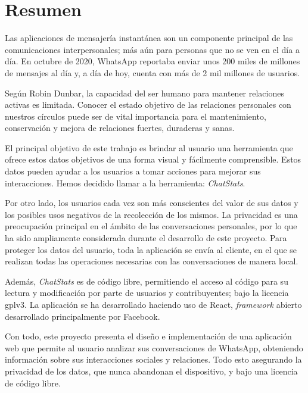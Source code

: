 \cleardoublepage
{}
\chapter*{Resumen}

Las aplicaciones de mensajería instantánea son un componente principal de las comunicaciones interpersonales; más aún para personas que no se ven en el día a día. En octubre de 2020, WhatsApp reportaba enviar unos 200 miles de millones de mensajes al día \cite{whatsAppsPerDay} y, a día de hoy, cuenta con más de 2 mil millones de usuarios.\cite{whatsAppsUsers}

Según Robin Dunbar, la capacidad del ser humano para mantener relaciones activas es limitada.\cite{dunbarNumber} Conocer el estado objetivo de las relaciones personales con nuestros círculos puede ser de vital importancia para el mantenimiento, conservación y mejora de relaciones fuertes, duraderas y sanas.

El principal objetivo de este trabajo es brindar al usuario una herramienta que ofrece estos datos objetivos de una forma visual y fácilmente comprensible. Estos datos pueden ayudar a los usuarios a tomar acciones para mejorar sus interacciones. Hemos decidido llamar a la herramienta: \textit{ChatStats}.

Por otro lado, los usuarios cada vez son más conscientes del valor de sus datos y los posibles usos negativos de la recolección de los mismos. La privacidad es una preocupación principal en el ámbito de las conversaciones personales, por lo que ha sido ampliamente considerada durante el desarrollo de este proyecto. Para proteger los datos del usuario, toda la aplicación se envía al cliente, en el que se realizan todas las operaciones necesarias con las conversaciones de manera local. 

Además, \textit{ChatStats} es de código libre, permitiendo el acceso al código para su lectura y modificación por parte de usuarios y contribuyentes; bajo la licencia \acrfull{gplv3}.\cite{GPLv3} La aplicación se ha desarrollado haciendo uso de React, \textit{framework} abierto desarrollado principalmente por Facebook.

Con todo, este proyecto presenta el diseño e implementación de una aplicación web que permite al usuario analizar sus conversaciones de WhatsApp, obteniendo información sobre sus interacciones sociales y relaciones. Todo esto asegurando la privacidad de los datos, que nunca abandonan el dispositivo, y bajo una licencia de código libre.

